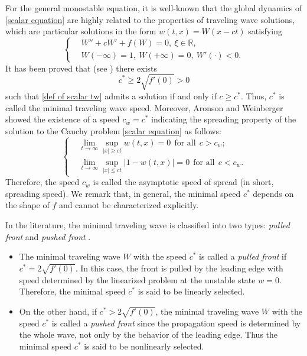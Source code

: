 \documentclass[11pt,a4paper]{article}
\numberwithin{equation}{section}
\numberwithin{figure}{section}
\newcommand{\red}[1]{{\color{red}#1}}
\begin{document}
For the general monostable equation, it is well-known that the global dynamics of \eqref{scalar equation} are highly related to the properties of traveling wave solutions,
which are particular solutions in the form
$w(t, x)=W(x-ct)$ satisfying
\begin{equation}\label{def of scalar tw}
\left\{
\begin{aligned}
&W''+cW'+f(W)=0,\ \xi\in\mathbb{R},\\
&W(-\infty)=1,\ W(+\infty)=0,\ W'(\cdot)<0.
\end{aligned}
\right.
\end{equation}
It has been proved that (see \cite{Aronson Weinberger,Volpert}) there exists 
$$c^*\geq 2\sqrt{f'(0)}>0$$
such that \eqref{def of scalar tw} admits a solution if and only if $c\geq c^*$. Thus, $c^*$ is called the minimal traveling wave speed. Moreover, Aronson and Weinberger \cite{Aronson Weinberger} showed the existence of a speed $c_w=c^*$ indicating the %
spreading property
of the solution to the Cauchy problem \eqref{scalar equation}
as follows:
\begin{equation*}
\left\{
\begin{aligned}
&\lim_{t\to\infty}\sup_{|x|\ge ct}w(t,x)=0\ \ \mbox{for all} \ \ c>c_w;\\
&\lim_{t\to\infty}\sup_{|x|\le ct}|1-w(t,x)|=0\ \ \mbox{for all} \ \ c<c_w.
\end{aligned}
\right.
\end{equation*}
Therefore, the speed $c_w$ is called the asymptotic speed of spread (in short, spreading speed).
We remark that, in general, the minimal speed $c^*$ depends on the shape of $f$ and cannot be characterized explicitly.







In the literature, the minimal traveling wave is classified into two types: {\em pulled front} and
{\em pushed front} \cite{Rothe1981,Stokes1976,van Saarloos2003}.
\begin{itemize}
    \item The minimal traveling wave $W$ with the speed $c^*$ is called a {\em pulled front} if $c^*=2\sqrt{f'(0)}$.
In this case, the front is pulled by the leading edge with speed determined by the linearized problem at the unstable state $w=0$. Therefore, the minimal speed $c^*$ is said to be linearly selected. 
\item On the other hand, if $c^*>2\sqrt{f'(0)}$,
the minimal traveling wave $W$ with the speed $c^*$ is called a {\em pushed front} since
the propagation speed is determined by the whole wave, not only by the behavior of the leading edge. Thus
the minimal speed $c^*$ is said to be nonlinearly selected.
\end{itemize}
\end{document}
